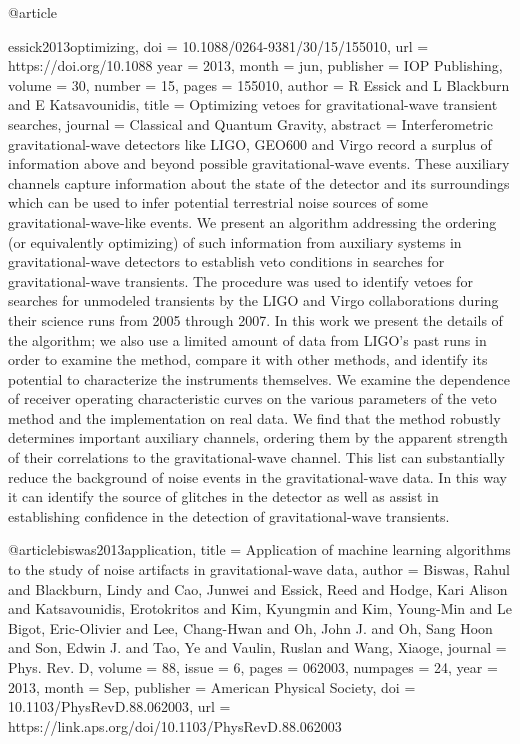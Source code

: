 {@article{essick2013optimizing,
	doi = {10.1088/0264-9381/30/15/155010},
	url = {https://doi.org/10.1088%
	year = 2013,
	month = {jun},
	publisher = {{IOP} Publishing},
	volume = {30},
	number = {15},
	pages = {155010},
	author = {R Essick and L Blackburn and E Katsavounidis},
	title = {Optimizing vetoes for gravitational-wave transient searches},
	journal = {Classical and Quantum Gravity},
	abstract = {Interferometric gravitational-wave detectors like LIGO, GEO600 and Virgo record a surplus of information above and beyond possible gravitational-wave events. These auxiliary channels capture information about the state of the detector and its surroundings which can be used to infer potential terrestrial noise sources of some gravitational-wave-like events. We present an algorithm addressing the ordering (or equivalently optimizing) of such information from auxiliary systems in gravitational-wave detectors to establish veto conditions in searches for gravitational-wave transients. The procedure was used to identify vetoes for searches for unmodeled transients by the LIGO and Virgo collaborations during their science runs from 2005 through 2007. In this work we present the details of the algorithm; we also use a limited amount of data from LIGO's past runs in order to examine the method, compare it with other methods, and identify its potential to characterize the instruments themselves. We examine the dependence of receiver operating characteristic curves on the various parameters of the veto method and the implementation on real data. We find that the method robustly determines important auxiliary channels, ordering them by the apparent strength of their correlations to the gravitational-wave channel. This list can substantially reduce the background of noise events in the gravitational-wave data. In this way it can identify the source of glitches in the detector as well as assist in establishing confidence in the detection of gravitational-wave transients.}
}

@article{biswas2013application,
  title = {Application of machine learning algorithms to the study of noise artifacts in gravitational-wave data},
  author = {Biswas, Rahul and Blackburn, Lindy and Cao, Junwei and Essick, Reed and Hodge, Kari Alison and Katsavounidis, Erotokritos and Kim, Kyungmin and Kim, Young-Min and Le Bigot, Eric-Olivier and Lee, Chang-Hwan and Oh, John J. and Oh, Sang Hoon and Son, Edwin J. and Tao, Ye and Vaulin, Ruslan and Wang, Xiaoge},
  journal = {Phys. Rev. D},
  volume = {88},
  issue = {6},
  pages = {062003},
  numpages = {24},
  year = {2013},
  month = {Sep},
  publisher = {American Physical Society},
  doi = {10.1103/PhysRevD.88.062003},
  url = {https://link.aps.org/doi/10.1103/PhysRevD.88.062003}
}


}}

